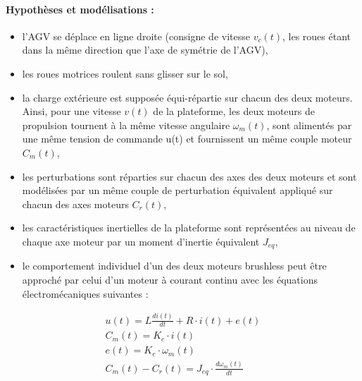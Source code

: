\paragraph{Hypothèses et modélisations :}
\begin{itemize}
 \item l'AGV se déplace en ligne droite (consigne de vitesse $v_c(t)$, les roues étant dans la même direction que l'axe de symétrie de l'AGV),
 \item les roues motrices roulent sans glisser sur le sol,
 \item la charge extérieure est supposée équi-répartie sur chacun des deux moteurs. Ainsi, pour une vitesse $v(t)$ de la plateforme, les deux moteurs de propulsion tournent à la même vitesse angulaire $\omega_m(t)$, sont alimentés par une même tension de commande u(t) et fournissent un même couple moteur $C_m(t)$,
 \item les perturbations sont réparties sur chacun des axes des deux moteurs et sont modélisées par un même couple de perturbation équivalent appliqué sur chacun des axes moteurs $C_r(t)$,
 \item les caractéristiques inertielles de la plateforme sont représentées au niveau de chaque axe moteur par un moment d'inertie équivalent $J_{eq}$,
 \item le comportement individuel d'un des deux moteurs brushless peut être approché par celui d'un moteur à courant continu avec les équations électromécaniques suivantes :
\end{itemize}

\vspace{-0.5cm}

\begin{eqnarray}
u(t)=L\frac{di(t)}{dt}+R\cdot i(t)+e(t)\\
C_m(t)=K_c\cdot i(t)\\
e(t)=K_e\cdot \omega_m(t)\\
C_m(t)-C_r(t)=J_{eq}\cdot\frac{d\omega_m(t)}{dt}
\end{eqnarray}

